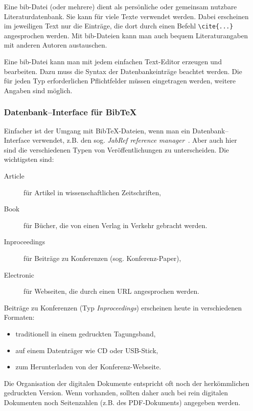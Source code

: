 \documentclass[a4paper, 10pt]{article}
\begin{document}
Eine bib-Datei (oder mehrere) dient als pers\"onliche oder
gemeinsam nutzbare Literaturdatenbank. Sie
kann f\"ur viele Texte verwendet werden. Dabei erscheinen im jeweiligen Text nur
die Eintr\"age, die dort durch einen Befehl
\verb+\cite{...}+ angesprochen werden. Mit bib-Dateien kann man auch bequem
Literaturangaben mit anderen Autoren austauschen.

Eine bib-Datei kann man mit jedem einfachen Text-Editor erzeugen und
bearbeiten. Dazu muss die Syntax der Datenbankeintr\"age beachtet werden. Die
f\"ur jeden Typ erforderlichen Pflichtfelder m\"ussen eingetragen werden,
weitere Angaben sind m\"oglich.


\subsubsection{Datenbank--Interface f\"ur BibTeX}

Einfacher ist der Umgang mit BibTeX-Dateien, wenn man ein Datenbank--Interface
verwendet, z.B. den sog. \emph{JabRef reference
manager}~\cite{sourceforge:jabref:2011}.
Aber auch hier sind die verschiedenen Typen von Ver\"offentlichungen zu
unterscheiden. Die wichtigsten sind:

\begin{description}
 \item[Article]
f\"ur Artikel in wissenschaftlichen Zeitschriften,
\item[Book]
f\"ur B\"ucher, die von einen Verlag in Verkehr gebracht werden.
\item[Inproceedings]
f\"ur Beitr\"age zu Konferenzen (sog. Konferenz-Paper),
\item[Electronic]
f\"ur Webseiten, die durch einen URL angesprochen werden.
 \end{description}

Beitr\"age zu Konferenzen (Typ \emph{Inproceedings}) erscheinen heute in
verschiedenen Formaten:
\begin{itemize}
 \item traditionell in einem gedruckten Tagungsband,
\item auf einem Datentr\"ager wie CD oder USB-Stick,
\item zum Herunterladen von der Konferenz-Webseite.
\end{itemize}
Die Organisation der digitalen Dokumente entspricht oft noch der herk\"ommlichen
gedruckten Version.
Wenn vorhanden, sollten daher auch bei rein digitalen Dokumenten noch
Seitenzahlen (z.B. des PDF-Dokuments) angegeben werden.
\end{document}
